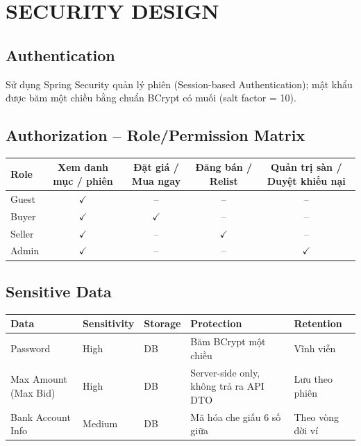 \documentclass[11pt,a4paper]{article}
\begin{document}
\section{SECURITY DESIGN}

\subsection{Authentication}
Sử dụng Spring Security quản lý phiên (Session-based Authentication); mật khẩu được băm một chiều bằng chuẩn BCrypt có muối (salt factor = 10).

\subsection{Authorization -- Role/Permission Matrix}
\begin{table}[H]
    \centering
    \small
    \begin{tabularx}{\textwidth}{|l|c|c|c|c|}
        \hline
        \textbf{Role} & \textbf{Xem danh mục / phiên} & \textbf{Đặt giá / Mua ngay} & \textbf{Đăng bán / Relist} & \textbf{Quản trị sàn / Duyệt khiếu nại} \\ \hline
        Guest & $\checkmark$ & -- & -- & -- \\ \hline
        Buyer & $\checkmark$ & $\checkmark$ & -- & -- \\ \hline
        Seller & $\checkmark$ & -- & $\checkmark$ & -- \\ \hline
        Admin & $\checkmark$ & -- & -- & $\checkmark$ \\ \hline
    \end{tabularx}
\end{table}

\subsection{Sensitive Data}
\begin{table}[H]
    \centering
    \small
    \begin{tabularx}{\textwidth}{|l|l|l|X|l|}
        \hline
        \textbf{Data} & \textbf{Sensitivity} & \textbf{Storage} & \textbf{Protection} & \textbf{Retention} \\ \hline
        Password & High & DB & Băm BCrypt một chiều & Vĩnh viễn \\ \hline
        Max Amount (Max Bid) & High & DB & Server-side only, không trả ra API DTO & Lưu theo phiên \\ \hline
        Bank Account Info & Medium & DB & Mã hóa che giấu 6 số giữa & Theo vòng đời ví \\ \hline
    \end{tabularx}
\end{table}
\end{document}
